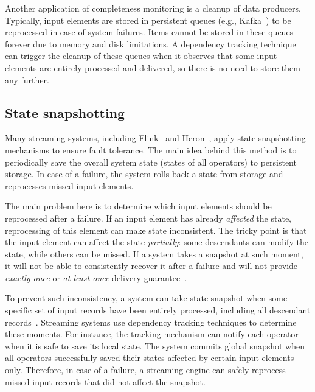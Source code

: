 Another application of completeness monitoring is a cleanup of data producers. Typically, input elements are stored in persistent queues (e.g., Kafka~\cite{kreps2011kafka}) to be reprocessed in case of system failures. Items cannot be stored in these queues forever due to memory and disk limitations. A dependency tracking technique can trigger the cleanup of these queues when it observes that some input elements are entirely processed and delivered, so there is no need to store them any further.

\subsection{State snapshotting}
Many streaming systems, including Flink~\cite{Carbone:2017:SMA:3137765.3137777} and Heron~\cite{Kulkarni:2015:THS:2723372.2742788}, apply state snapshotting mechanisms to ensure fault tolerance. The main idea behind this method is to periodically save the overall system state (states of all operators) to persistent storage. In case of a failure, the system rolls back a state from storage and reprocesses missed input elements. 

The main problem here is to determine which input elements should be reprocessed after a failure. If an input element has already {\em affected} the state, reprocessing of this element can make state inconsistent. The tricky point is that the input element can affect the state {\em partially}: some descendants can modify the state, while others can be missed. If a system takes a snapshot at such moment, it will not be able to consistently recover it after a failure and will not provide {\em exactly once} or {\em at least once} delivery guarantee~\cite{2015arXiv150608603C, Carbone:2017:SMA:3137765.3137777}.

To prevent such inconsistency, a system can take state snapshot when some specific set of input records have been entirely processed, including all descendant records~\cite{2015arXiv150608603C, thepaper}. Streaming systems use dependency tracking techniques to determine these moments. For instance, the tracking mechanism can notify each operator when it is safe to save its local state. The system commits global snapshot when all operators successfully saved their states affected by certain input elements only. Therefore, in case of a failure, a streaming engine can safely reprocess missed input records that did not affect the snapshot.

